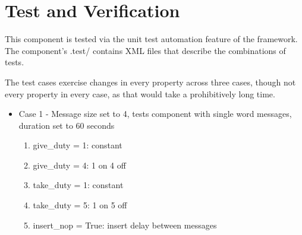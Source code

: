 \documentclass{article}
\begin{document}
\section*{Test and Verification}
\begin{flushleft}
This component is tested via the unit test automation feature of the framework. The component's .test/ contains XML files that describe the combinations of tests. \medskip

The test cases exercise changes in every property across three cases, though not every property in every case, as that would take a prohibitively long time.

\begin{itemize}
\item Case 1 - Message size set to 4, tests component with single word messages, duration set to 60 seconds
\begin{enumerate}
	\item give\_duty = 1: constant
	\item give\_duty = 4: 1 on 4 off
	\item take\_duty = 1: constant
	\item take\_duty = 5: 1 on 5 off
	\item insert\_nop = True: insert delay between messages

\end{enumerate}
\end{itemize}
\end{flushleft}
\end{document}
